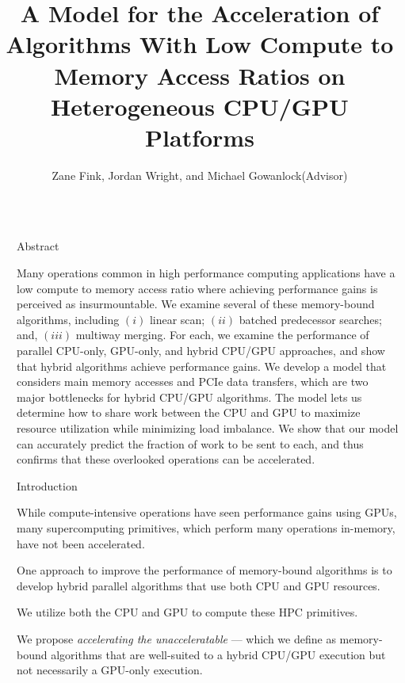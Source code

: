 \documentclass[final]{beamer}
\title{A Model for the Acceleration of Algorithms With Low Compute to Memory Access Ratios on Heterogeneous CPU/GPU Platforms}
\author{Zane Fink\inst{1}, Jordan Wright\inst{1}, and Michael Gowanlock\inst{1}(Advisor)}
\institute[shortinst]{\inst{1} School of Informatics, Computing, and Cyber Systems at Northern Arizona University}
\newlength{\sepwidth}
\newlength{\colwidth}
\newcommand{\separatorcolumn}{\begin{column}{\sepwidth}\end{column}}
\begin{document}
\begin{frame}[t]
\begin{columns}[t]
\separatorcolumn

\begin{column}{\colwidth}

  \begin{block}{Abstract}

   Many operations common in high performance computing applications have a low compute to memory access ratio where achieving performance gains is perceived as insurmountable.
   We examine several of these memory-bound algorithms, 
   including $(i)$ linear scan; $(ii)$ batched predecessor searches; and, $(iii)$ multiway merging. 
   For each, we examine the performance of parallel CPU-only, GPU-only, and hybrid CPU/GPU approaches, and show 
   that hybrid algorithms achieve performance gains. We develop a model that considers 
   main memory accesses and PCIe data transfers, which are two major bottlenecks for hybrid CPU/GPU algorithms. 
   The model lets us determine how to share work between the CPU and GPU to maximize resource 
   utilization while minimizing load imbalance. We show that our model can accurately predict the fraction of work 
   to be sent to each, and thus confirms that these overlooked operations can be 
   accelerated. 

  \end{block}

  \begin{block}{Introduction}
    
\begin{description}[font=$\bullet$~\normalfont\scshape\color{red!50!black}]

\item While compute-intensive operations have seen performance gains using GPUs, many supercomputing primitives, which perform many operations in-memory, have not been accelerated. 

\item One approach to improve the performance of memory-bound algorithms is to develop hybrid parallel algorithms that use both CPU and GPU resources.

\item We utilize both the CPU and GPU to compute these HPC primitives.

\item We propose \emph{accelerating the unacceleratable} --- which we define as memory-bound algorithms that are well-suited to a hybrid CPU/GPU execution but not necessarily a GPU-only execution. 


\end{description}
\end{block}
\end{column}
\end{columns}
\end{frame}
\end{document}
